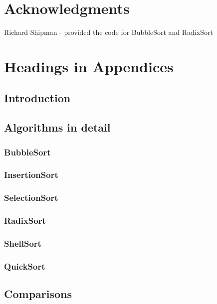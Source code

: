 \documentclass{acm_proc_article-sp}
\begin{document}
\section{Acknowledgments}
Richard Shipman - provided the code for BubbleSort and RadixSort

%

%
%
\balancecolumns
\appendix
\section{Headings in Appendices}

\subsection{Introduction}
\subsection{Algorithms in detail}
\subsubsection{BubbleSort}
\subsubsection{InsertionSort}
\subsubsection{SelectionSort}
\subsubsection{RadixSort}
\subsubsection{ShellSort}
\subsubsection{QuickSort}
\subsection{Comparisons}
\end{document}
